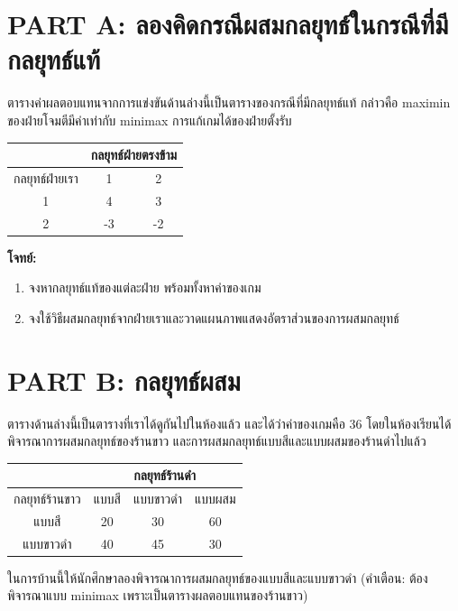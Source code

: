 \section*{PART A: ลองคิดกรณีผสมกลยุทธ์ในกรณีที่มีกลยุทธ์แท้}
ตารางค่าผลตอบแทนจากการแข่งขันด้านล่างนี้เป็นตารางของกรณีที่มีกลยุทธ์แท้ กล่าวคือ maximin ของฝ่ายโจมตีมีค่าเท่ากับ minimax การแก้เกมได้ของฝ่ายตั้งรับ
\begin{center}
\begin{tabular}{|c|cc|}
	\hline
	               & \multicolumn{2}{c|}{กลยุทธ์ฝ่ายตรงข้าม}               \\ \hline
	กลยุทธ์ฝ่ายเรา        & \multicolumn{1}{c|}{1}  & \multicolumn{1}{c|}{2}   \\ \hline
	1              & \multicolumn{1}{c|}{4}  & \multicolumn{1}{c|}{3}   \\ \hline
	2              & \multicolumn{1}{c|}{-3} & \multicolumn{1}{c|}{-2}  \\ \hline
\end{tabular}
\end{center}
\textbf{โจทย์:}
\begin{enumerate}
	\item จงหากลยุทธ์แท้ของแต่ละฝ่าย พร้อมทั้งหาค่าของเกม
	\item จงใช้วิธีผสมกลยุทธ์จากฝ่ายเราและวาดแผนภาพแสดงอัตราส่วนของการผสมกลยุทธ์
\end{enumerate}

\section*{PART B: กลยุทธ์ผสม}
ตารางด้านล่างนี้เป็นตารางที่เราได้ดูกันไปในห้องแล้ว และได้ว่าค่าของเกมคือ 36 โดยในห้องเรียนได้พิจารณาการผสมกลยุทธ์ของร้านขาว และการผสมกลยุทธ์แบบสีและแบบผสมของร้านดำไปแล้ว
\begin{center}
	\begin{tabular}{|c|ccc|}
		\hline
		& \multicolumn{3}{c|}{กลยุทธ์ร้านดำ}               \\ \hline
		กลยุทธ์ร้านขาว & \multicolumn{1}{c|}{แบบสี}  & \multicolumn{1}{c|}{แบบขาวดำ}   & \multicolumn{1}{c|}{แบบผสม}\\ \hline
		แบบสี     & \multicolumn{1}{c|}{20}  & \multicolumn{1}{c|}{30}   & \multicolumn{1}{c|}{60}\\ \hline
		แบบขาวดำ   & \multicolumn{1}{c|}{40} & \multicolumn{1}{c|}{45}  & \multicolumn{1}{c|}{30}\\ \hline
	\end{tabular}
\end{center}
ในการบ้านนี้ให้นักศึกษาลองพิจารณาการผสมกลยุทธ์ของแบบสีและแบบขาวดำ (คำเตือน: ต้องพิจารณาแบบ minimax เพราะเป็นตารางผลตอบแทนของร้านขาว)